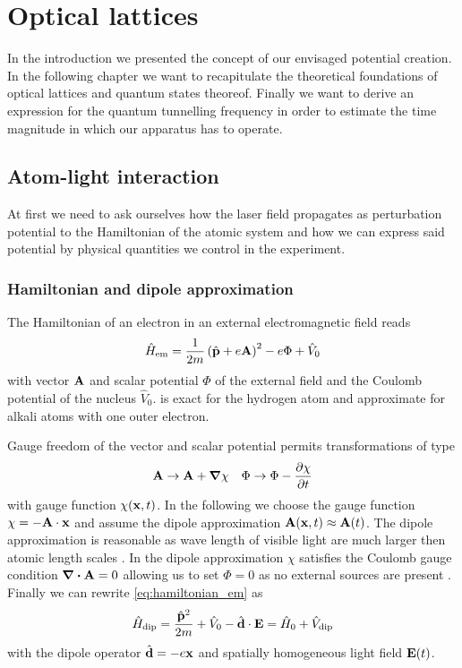 \chapter{Optical lattices}

In the introduction we presented the concept of our envisaged potential
creation. In the following chapter we want to recapitulate the theoretical
foundations of optical lattices and quantum states theoreof. Finally we want
to derive an expression for the quantum tunnelling frequency in order to
estimate the time magnitude in which our apparatus has to operate.

\section{Atom-light interaction}

At first we need to ask ourselves how the laser field propagates as
perturbation potential to the Hamiltonian of the atomic system and how we can
express said potential by physical quantities we control in the experiment.

\subsection{Hamiltonian and dipole approximation}

The Hamiltonian of an electron in an external electromagnetic field reads
\begin{equation}
  \hat{H}_\text{em}
  =\frac{1}{2m}\left(\hat{\vb{p}}+e\vb{A}\right)^2-e\Phi+\hat{V}_0
  \label{eq:hamiltonian_em}
\end{equation}
with vector $\vb{A}$ and scalar potential $\Phi$ of the external field and
the Coulomb potential of the nucleus $\hat{V}_0$.  is
exact for the hydrogen atom and approximate for alkali atoms with one outer
electron.

Gauge freedom of the vector and scalar potential permits transformations of
type
\begin{align}
  \vb{A}\to\vb{A}+\grad{\chi}
  &&
  \Phi\to\Phi-\pdv{\chi}{t}
\end{align}
with gauge function $\chi(\vb{x},t)$. In the following we choose the gauge
function $\chi=-\vb{A}\cdot\vb{x}$ and assume the dipole approximation
$\vb{A}(\vb{x},t)\approx\vb{A}(t)$. The dipole approximation is reasonable as
wave length of visible light are much larger then atomic length scales
\cite{Gerry2004}. In the dipole approximation $\chi$ satisfies the Coulomb
gauge condition $\divergence{\vb{A}}=0$ allowing us to set $\Phi=0$ as no
external sources are present \cite{Jackson2005}. Finally we can rewrite
\cref{eq:hamiltonian_em} as
\begin{equation}
  \hat{H}_\text{dip}
  =\frac{\hat{\vb{p}}^2}{2m}+\hat{V}_0-\hat{\vb{d}}\cdot\vb{E}
  =\hat{H}_0+\hat{V}_\text{dip}
  \label{eq:hamiltonian_dip}
\end{equation}
with the dipole operator $\hat{\vb{d}}=-e\vb{x}$ and spatially homogeneous
light field $\vb{E}(t)$.

